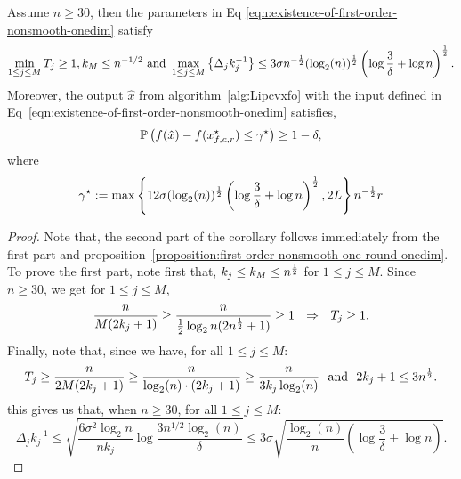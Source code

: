 \begin{corollary}
\label{corollary:first-order-nonsmooth-one-round-onedim}
Assume $n \geq 30$, then the parameters in Eq 
\eqref{eqn:existence-of-first-order-nonsmooth-onedim} satisfy
\begin{equation*}
\min_{1\leq j\leq M}T_j \geq 1, k_M \leq n^{-1/2}~\text{and}~
	\max_{1\leq j\leq M}\left\{\Delta_j k_j^{-1}\right\} \leq 3\sigma 
		n^{-\frac{1}{2}}(\log_2(n))^{\frac{1}{2}} \left(\log \frac{3}{\delta} + \log n\right)^{\frac{1}{2}}. 
\end{equation*} 
Moreover, the output $\hat{x}$ from algorithm~\ref{alg:Lipcvxfo} with 
the input defined in Eq~\eqref{eqn:existence-of-first-order-nonsmooth-onedim} satisfies, 
\begin{equation*}
\mathbb{P} \left(f(\hat{x}) - f(x_{f, c, r}^\star) \leq 
	\gamma^\star  \right) \geq 1-\delta, 
\end{equation*}
where 
\begin{equation*}
\gamma^\star := \max\left\{12\sigma (\log_2(n))^{\frac{1}{2}} \left(\log \frac{3}{\delta} + \log n\right)^{\frac{1}{2}}, 2 L\right\}
		n^{-\frac{1}{2}}r
\end{equation*}
\end{corollary}
\begin{proof}
Note that, the second part of the corollary follows immediately from the first part
and proposition~\ref{proposition:first-order-nonsmooth-one-round-onedim}. To 
prove the first part, note first that, $k_j \leq k_M \leq n^{\frac{1}{2}}$ for $1\leq j \leq M$. 
Since $n\geq 30$, we get for $1\leq j\leq M$, 
\begin{equation*}
\frac{n}{M(2k_j+1)} \geq \frac{n}{\frac{1}{2} \log_2 n(2n^{\frac{1}{2}} + 1)} \geq 1~~\Rightarrow~~
T_j \geq 1.
\end{equation*}
Finally, note that, since we have, for all $1\leq j\leq M$: 
\begin{equation*}
T_j \geq \frac{n}{2M(2k_j+1)} \geq \frac{n}{\log_2 (n) \cdot (2k_j+1)} \geq \frac{n}{3k_j \log_2(n)}
	~~\text{and}~~2k_j + 1\leq 3n^{\frac{1}{2}}.
\end{equation*}
this gives us that, when $n\geq 30$, for all $1\leq j\leq M$: 
\begin{equation*}
\Delta_j k_j^{-1} \leq \sqrt{\frac{6\sigma^2\log_2 n}{nk_j} \log \frac{3n^{1/2} \log_2(n)}{\delta}}
	\leq 3\sigma \sqrt{\frac{\log_2(n)}{n} \left(\log \frac{3}{\delta} + \log n\right)}.
\end{equation*}
\end{proof}

